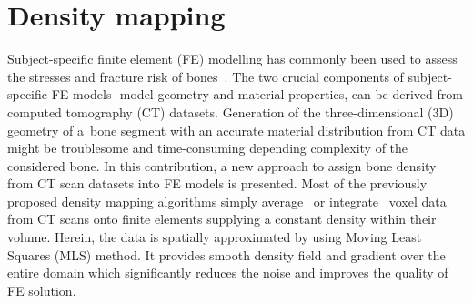 \documentclass[11pt]{ACMEarticle}
\numberwithin{equation}{section}
\begin{document}
\section{Density mapping}
\label{sec:dens_mapping}
Subject-specific finite element (FE) modelling has commonly been used to assess the stresses and fracture risk of bones~\citep{poelert2013patient,Helgason2008b,Yosibash2010}. The two crucial components of subject-specific FE models- model geometry and material properties, can be derived from computed tomography (CT) datasets. Generation of the three-dimensional (3D) geometry of a~bone segment with an accurate material distribution from CT data might be troublesome and time-consuming depending complexity of the considered bone. In this contribution, a new approach to assign bone density from CT scan datasets into FE models is presented. Most of the previously proposed density mapping algorithms simply average~\citep{zannoni1999material} or integrate~\citep{taddei2007material, schileo2008subject} voxel data from CT scans onto finite elements supplying a constant density within their volume. Herein, the data is spatially approximated by using Moving Least Squares (MLS) method. It provides smooth density field and gradient over the entire domain which significantly reduces the noise and improves the quality of FE solution. 
\end{document}

